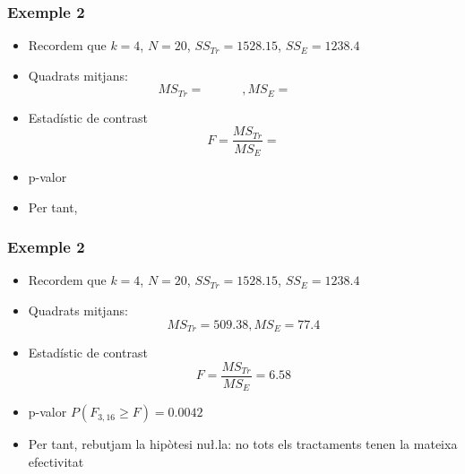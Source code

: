 \documentclass[12pt,t]{beamer}
\renewcommand{\geq}{\geqslant}
\theoremstyle{plain}
\theoremstyle{definition}
\begin{document}
\begin{frame} 
\frametitle{Exemple 2}
\begin{itemize}

\item Recordem que $k=4$,  $N=20$, 
$SS_{Tr}=1528.15$, $SS_E=1238.4$
\medskip 

\item Quadrats mitjans:
$$
MS_{Tr}=\qquad\quad, 
MS_E=\qquad\quad{}
$$

\item Estadístic de contrast
$$
F=\frac{MS_{Tr}}{MS_E}=
$$

\item p-valor 
\medskip 

\item Per tant,
\end{itemize}
\end{frame}



\begin{frame} 
\frametitle{Exemple 2}
\begin{itemize}

\item Recordem que $k=4$,  $N=20$, 
$SS_{Tr}=1528.15$, $SS_E=1238.4$
\medskip 

\item Quadrats mitjans:
$$
MS_{Tr}=509.38, 
MS_E=77.4
$$

\item Estadístic de contrast
$$
F=\frac{MS_{Tr}}{MS_E}=6.58
$$

\item p-valor  $P(F_{3,16}\geq F)=0.0042$ 
\medskip 

\item Per tant, rebutjam la hipòtesi nu\l.la: no tots els tractaments tenen la mateixa efectivitat
\end{itemize}
\end{frame}


\end{document}
